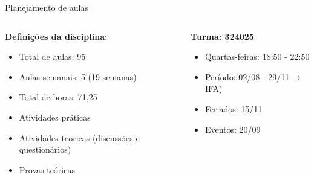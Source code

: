 \documentclass{beamer}
\begin{document}
\begin{frame}[fragile]{Planejamento de aulas}
      \begin{columns}
            \begin{column}{0.5\textwidth}
                  \textbf{Definições da disciplina:}
                  \begin{itemize}
                        \item Total de aulas: 95 
                        \item Aulas semanais: 5 (19 semanas)
                        \item Total de horas: 71,25
                        \item Atividades práticas
                        \item Atividades teoricas (discussões e questionários)
                        \item Provas teóricas
      
                  \end{itemize}


            \end{column}
            \begin{column}{0.5\textwidth}
                  \textbf{Turma: 324025}
                  \begin{itemize}
                        \item Quartas-feiras: 18:50 - 22:50
                        \item Período: 02/08 - 29/11 → IFA)
                        \item Feriados: 15/11
                        \item Eventos: 20/09
                  \end{itemize}
                  
            \end{column}
      \end{columns}
\end{frame}




%
%
%            
%        
\end{document}
